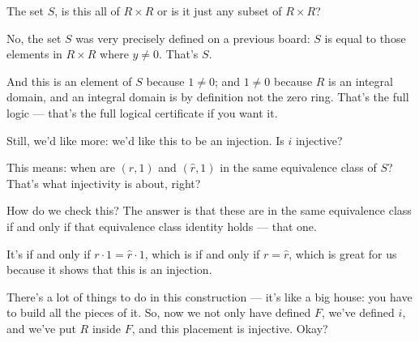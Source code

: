 \begin{student}
The set $S$, is this all of $R \times R$ or is it just any subset of $R \times R$?
\end{student}

\begin{speech}[00:53:50 - 00:54:22]
No, the set $S$ was very precisely defined on a previous board: $S$ is equal to those elements in $R \times R$ where $y \neq 0$.  That's $S$.

And this is an element of $S$ because $1 \neq 0$; and $1 \neq 0$ because $R$ is an integral domain, and an integral domain is by definition not the zero ring. That's the full logic --- that's the full logical certificate if you want it.
\end{speech}

\begin{speech}[00:54:22 - 00:56:32]
Still, we'd like more: we'd like this to be an injection. Is $i$ injective? 

This means: when are $(r, 1)$ and $(\hat{r}, 1)$ in the same equivalence class of $S$?  That's what injectivity is about, right?

How do we check this? The answer is that these are in the same equivalence class if and only if that equivalence class identity holds --- that one. 

It's if and only if $r \cdot 1 = \hat{r} \cdot 1$,  which is if and only if $r = \hat{r}$,  which is great for us because it shows that this is an injection. 

There's a lot of things to do in this construction --- it's like a big house: you have to build all the pieces of it. So, now we not only have defined $F$, we've defined $i$, and we've put $R$ inside $F$, and this placement is injective. Okay?
\end{speech}

